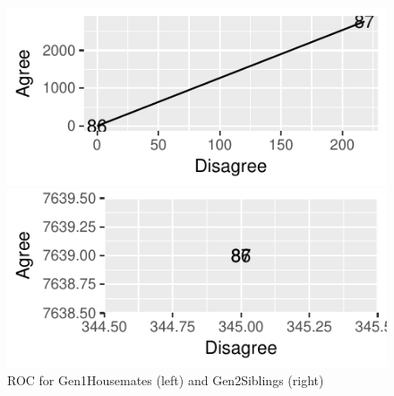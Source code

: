 \documentclass[a4paper]{article}\usepackage[]{graphicx}\usepackage[]{color}
\makeatletter
\def\maxwidth{ %
  \ifdim\Gin@nat@width>\linewidth
    \linewidth
  \else
    \Gin@nat@width
  \fi
}
\newenvironment{knitrout}{}{} %
\makeatother
\begin{document}
\begin{figure}[htbp]
\begin{knitrout}
\color{fgcolor}
\includegraphics[width=\maxwidth]{figure/unnamed-chunk-2-1} 

\includegraphics[width=\maxwidth]{figure/unnamed-chunk-2-2} 

\end{knitrout}
\caption{ROC for Gen1Housemates (left) and Gen2Siblings (right)}
\end{figure}
\end{document}
